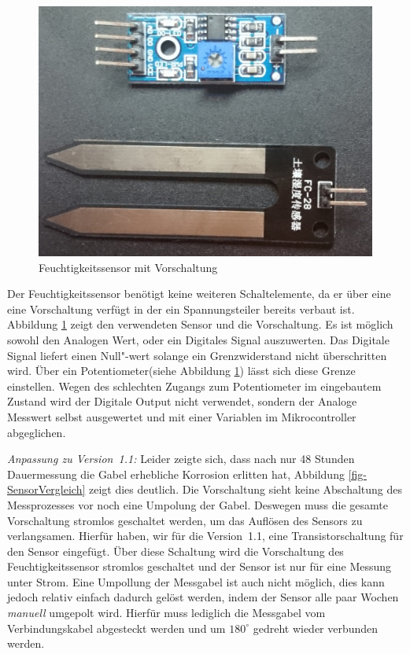 \begin{figure}[!h]
	\centering
	\includegraphics[width=0.9\linewidth]{bilder/_feuchteSensor1.jpg}
	\caption{Feuchtigkeitssensor mit Vorschaltung}
	\label{fig-SensorVorschaltung}
\end{figure}
Der Feuchtigkeitssensor benötigt keine weiteren Schaltelemente, da er über eine eine Vorschaltung verfügt in der ein Spannungsteiler bereits verbaut ist. 
Abbildung \ref{fig-SensorVorschaltung} zeigt den verwendeten Sensor und die Vorschaltung. 
Es ist möglich sowohl den Analogen Wert, oder ein Digitales Signal auszuwerten. 
Das Digitale Signal liefert einen Null"-wert solange ein Grenzwiderstand nicht überschritten wird. 
Über ein  Potentiometer(siehe Abbildung \ref{fig-SensorVorschaltung}) lässt sich diese Grenze einstellen. 
Wegen des schlechten Zugangs zum Potentiometer im eingebautem Zustand wird der Digitale Output nicht verwendet, sondern der Analoge Messwert selbst ausgewertet und mit einer Variablen im Mikrocontroller abgeglichen.
		
\emph{Anpassung zu Version~1.1:}
Leider zeigte sich, dass nach nur 48 Stunden Dauermessung die Gabel erhebliche Korrosion erlitten hat, Abbildung \ref{fig-SensorVergleich} zeigt dies deutlich.
Die Vorschaltung sieht keine Abschaltung des Messprozesses vor noch eine Umpolung der Gabel. 
Deswegen muss die gesamte Vorschaltung stromlos geschaltet werden, um das Auflösen des Sensors zu verlangsamen. 
Hierfür haben, wir für die Version~1.1, eine Transistorschaltung für den Sensor eingefügt. 
Über diese Schaltung wird die Vorschaltung des Feuchtigkeitssensor stromlos geschaltet und der Sensor ist nur für eine Messung unter Strom. 
Eine Umpollung der Messgabel ist auch nicht möglich, dies kann jedoch relativ einfach dadurch gelöst werden, indem der Sensor alle paar Wochen \emph{manuell} umgepolt wird. 
Hierfür muss lediglich die Messgabel vom Verbindungskabel abgesteckt werden und um \begin{math}180^{\circ}\end{math} gedreht wieder verbunden werden.

